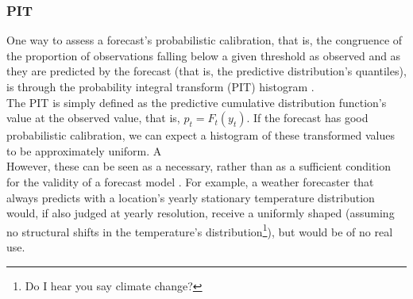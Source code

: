 \subsubsection{PIT}
One way to assess a forecast's probabilistic calibration, that is, the congruence of the proportion of observations falling below a given threshold as observed and as they are predicted by the forecast (that is, the predictive distribution's quantiles), is through the probability integral transform (PIT) histogram \citep{dawid_present_1984}.  \\
The PIT is simply defined as the predictive cumulative distribution function's value at the observed value, that is, $p_t = F_t(y_t)$. If the forecast has good probabilistic calibration, we can expect a histogram of these transformed values to be approximately uniform. A \\
However, these can be seen as a necessary, rather than as a sufficient condition for the validity of a forecast model \cite{gneiting_probabilistic_2007}. For example, a weather forecaster that always predicts with a location's yearly stationary temperature distribution would, if also judged at yearly resolution, receive a uniformly shaped (assuming no structural shifts in the temperature's distribution\footnote{Do I hear you say climate change?}), but would be of no real use.
